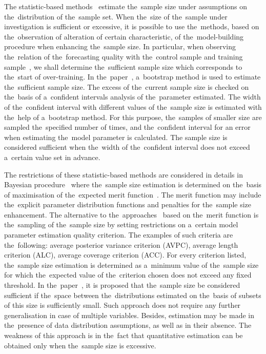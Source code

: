 \documentclass[
11pt,%
tightenlines,%
twoside,%
onecolumn,%
nofloats,%
nobibnotes,%
nofootinbib,%
superscriptaddress,%
noshowpacs,%
centertags]%
{revtex4}
\begin{document}
The statistic-based methods~\cite{motrenko2014,qumsiyeh2013} estimate the~sample size under assumptions on the~distribution of the~sample set. When the~size of the~sample under investigation is sufficient or excessive, it is possible to use the~methods, based on the~observation of alteration of certain characteristic, of the~model-building procedure when enhancing the~sample size. In particular, when observing the~relation of the~forecasting quality with the~control sample and training sample~\cite{motrenko2014}, we shall determine the~sufficient sample size which corresponds to the~start of over-training. In the~paper~\cite{qumsiyeh2013}, a~bootstrap method is used to estimate the~sufficient sample size. The excess of the~current sample size is checked on the~basis of a~confident intervals analysis of the~parameter estimated. The width of the~confident interval with different values of the~sample size is estimated with the~help of a~bootstrap method. For this purpose, the~samples of smaller size are sampled the~specified number of times, and the~confident interval for an error when estimating the~model parameter is calculated. The sample size is considered sufficient when the~width of the~confident interval does not exceed a~certain value set in advance.

The restrictions of these statistic-based methods are considered in details in Bayesian procedure~\cite{lindley1997, rubin1998, wang2002} where the~sample size estimation is determined on the~basis of maximisation of the~expected merit function~\cite{lindley1997}. The merit function may include the~explicit parameter distribution functions and penalties for the~sample size enhancement. The alternative to the~approaches~\cite{wang2002} based on the~merit function is the~sampling of the~sample size by setting restrictions on a~certain model parameter estimation quality criterion. The examples of such criteria are the~following: average posterior variance criterion (AVPC), average length criterion (ALC), average coverage criterion (ACC). For every criterion listed, the~sample size estimation is determined as a~minimum value of the~sample size for which the~expected value of the~criterion chosen does not exceed any fixed threshold. In the~paper~\cite{motrenko2014}, it is proposed that the~sample size be considered sufficient if the~space between the~distributions estimated on the~basis of subsets of this size is sufficiently small. Such approach does not require any further generalisation in case of multiple variables. Besides, estimation may be made in the~presence of data distribution assumptions, as well as in their absence. The weakness of this approach is in the~fact that quantitative estimation can be obtained only when the~sample size is excessive. 
\end{document}
